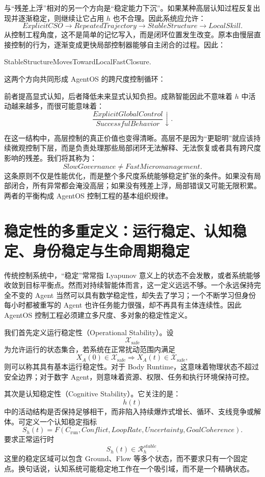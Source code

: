 与“残差上浮”相对的另一个方向是“稳定能力下沉”。如果某种高层认知过程反复出现并逐渐稳定，则继续让它占用 $h$ 也不合理。因此系统应允许：
\[
ExplicitCSO
\rightarrow
RepeatedTrajectory
\rightarrow
StableStructure
\rightarrow
LocalSkill.
\]
从控制工程角度，这不是简单的记忆写入，而是闭环位置发生改变。原本由慢层直接控制的行为，逐渐变成更快局部控制器能够自主闭合的过程。因此：
\begin{statementbox}
StableStructureMovesTowardLocalFastClosure.
\end{statementbox}

这两个方向共同形成 AgentOS 的跨尺度控制循环：
\begin{statementbox}
\centering
{}
\end{statementbox}
前者提高显式认知，后者降低未来显式认知负担。成熟智能因此不意味着 $h$ 中活动越来越多，而很可能意味着：
\[
\frac{
ExplicitGlobalControl
}{
SuccessfulBehavior
}
\downarrow.
\]

在这一结构中，高层控制的真正价值也变得清晰。高层不是因为“更聪明”就应该持续微观控制下层，而是负责处理那些局部闭环无法解释、无法恢复或者具有跨尺度影响的残差。我们将其称为：
\[
\boxed{
SlowGovernance\neq FastMicromanagement.
}
\]
这条原则不仅是性能优化，而是整个多尺度系统能够稳定扩张的条件。如果没有局部闭合，所有异常都会淹没高层；如果没有残差上浮，局部错误又可能无限积累。两者的平衡构成 AgentOS 控制工程的基本组织规律。

\section{稳定性的多重定义：运行稳定、认知稳定、身份稳定与生命周期稳定}

传统控制系统中，“稳定”常常指 Lyapunov 意义上的状态不会发散，或者系统能够收敛到目标平衡点。然而对持续智能体而言，这一定义远远不够。一个永远保持完全不变的 Agent 当然可以具有数学稳定性，却失去了学习；一个不断学习但身份每小时都被重写的 Agent 也许任务能力很强，却不再具有主体连续性。因此 AgentOS 控制工程必须建立多尺度、多对象的稳定性定义。

我们首先定义运行稳定性（Operational Stability）。设
\[
\mathcal X_{\mathrm{safe}}
\]
为允许运行的状态集合，若系统在正常扰动范围内满足
\[
X_A(0)\in\mathcal X_{\mathrm{safe}}
\Rightarrow
X_A(t)\in\mathcal X_{\mathrm{safe}},
\]
则可以称其具有基本运行稳定性。对于 Body Runtime，这意味着物理状态不超过安全边界；对于数字 Agent，则意味着资源、权限、任务和执行环境保持可控。

其次是认知稳定性（Cognitive Stability）。它关注的是：
\[
h(t)
\]
中的活动结构是否保持足够相干，而非陷入持续爆炸式增长、循环、支线竞争或解体。可定义一个认知稳定指标
\[
S_h(t)
=
F(
C_{\mathrm{run}},
Conflict,
LoopRate,
Uncertainty,
GoalCoherence
).
\]
要求正常运行时
\[
S_h(t)\in\mathcal R_h^{stable}.
\]
这里的稳定区域可以包含 Ground、Flow 等多个状态，而不要求只有一个固定点。换句话说，认知系统可能稳定地工作在一个吸引域，而不是一个精确状态。


